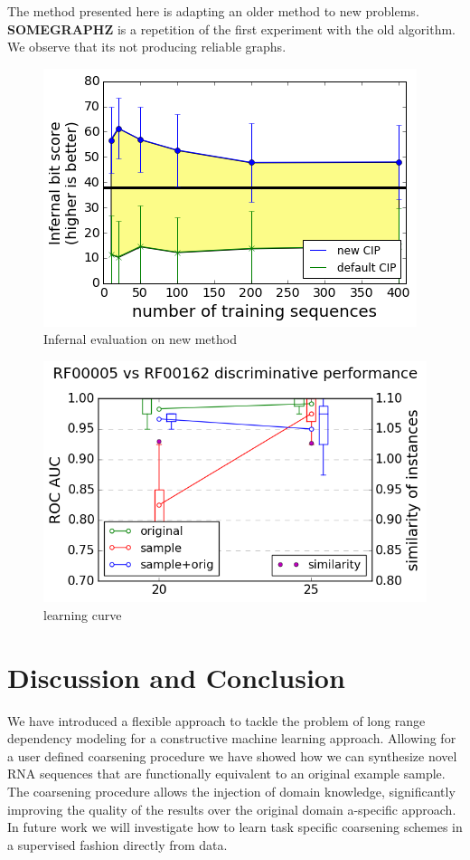 \documentclass{article}
\begin{document}
The method presented here is adapting an older method to new problems.
\textbf{SOMEGRAPHZ} is a repetition of the first experiment with 
the old algorithm. We observe that its not producing reliable
graphs.
\begin{figure}[ht]
      \centering
        \includegraphics[width=0.8\linewidth]{images/infernal_abstr.png}
      \caption{Infernal evaluation on new method}
      \label{alabelb}
\end{figure}

\begin{figure}[ht]
      \centering
        \includegraphics[width=0.8\linewidth]{images/learningcurve.png}
      \caption{learning curve}
      \label{alabelc}
\end{figure}



\section{Discussion and Conclusion}

We have introduced a flexible approach to tackle the problem of long range
dependency modeling for a constructive machine learning approach. Allowing for
a user defined coarsening procedure we have showed how we can synthesize novel
RNA sequences that are functionally equivalent to an original example sample.
The coarsening procedure allows the injection of domain knowledge,
significantly improving the quality of the results over the original domain a-specific approach. In future work we will investigate how to learn task
specific coarsening schemes in a supervised fashion directly from data.



\end{document}
